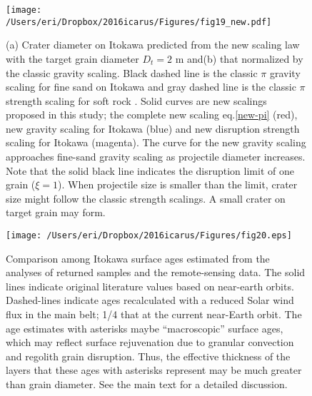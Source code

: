 \documentclass[3p,authoryear]{elsarticle}
\begin{document}
\begin{figure}[htbp]
	\begin{center}
	\texttt{[image: /Users/eri/Dropbox/2016icarus/Figures/fig19\_new.pdf]}
	\caption{(a) Crater diameter on Itokawa predicted from the new scaling law with the target grain diameter $D_t=2$ m and(b) that normalized by the classic gravity scaling. Black dashed line is the classic $\pi$ gravity scaling \citep[e.g.][]{holsapple1993} for fine sand on Itokawa and gray dashed line is the classic $\pi$ strength scaling for soft rock \citep{holsapple1993}. Solid curves are new scalings proposed in this study; the complete new scaling eq.\eqref{new-pi} (red), new gravity scaling for Itokawa (blue) and new disruption strength scaling for Itokawa (magenta).  The curve for the new gravity scaling approaches fine-sand gravity scaling as projectile diameter increases. Note that the solid black line indicates the disruption limit of one grain ($\xi=1$). When projectile size is smaller than the limit, crater size might follow the classic strength scalings. A small crater on target grain may form. }
	\label{Itokawa-crater}
	\end{center}
\end{figure}

\begin{figure}[htbp]
	\centering
	\texttt{[image: /Users/eri/Dropbox/2016icarus/Figures/fig20.eps]}
	\caption{Comparison among Itokawa surface ages estimated from the analyses of returned samples and the remote-sensing data\citep{obrien2005, michel2009, nagao2011, basilevsky2014, koga2014, meier2014, noguchi2014, berger2015, bonal2015, nishiizumi2015, park2015}. The solid lines indicate original literature values based on near-earth orbits. Dashed-lines indicate ages recalculated with a reduced Solar wind flux in the main belt; 1/4 that at the current near-Earth orbit. The age estimates with asterisks maybe ``macroscopic'' surface ages, which may reflect surface rejuvenation due to granular convection and regolith grain disruption. Thus, the effective thickness of the layers that these ages with asterisks represent may be much greater than grain diameter. See the main text for a detailed discussion. }
	\label{itokawa-ages}
	\centering
\end{figure}



\end{document}
